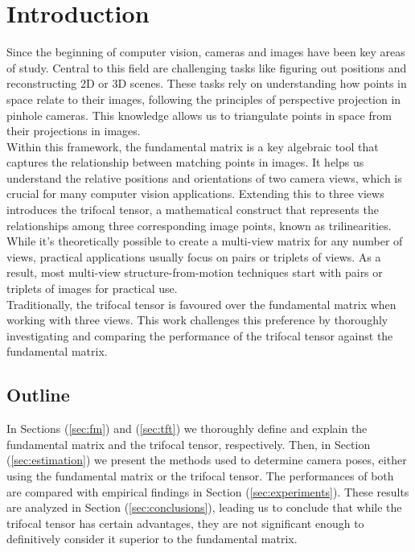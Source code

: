 \section{Introduction}\label{sec:intro}
Since the beginning of computer vision, cameras and images have been key areas of study. Central to this field are challenging tasks like figuring out positions and reconstructing 2D or 3D scenes. These tasks rely on understanding how points in space relate to their images, following the principles of perspective projection in pinhole cameras. This knowledge allows us to triangulate points in space from their projections in images.\\

Within this framework, the fundamental matrix is a key algebraic tool that captures the relationship between matching points in images. It helps us understand the relative positions and orientations of two camera views, which is crucial for many computer vision applications. Extending this to three views introduces the trifocal tensor, a mathematical construct that represents the relationships among three corresponding image points, known as trilinearities. While it's theoretically possible to create a multi-view matrix for any number of views, practical applications usually focus on pairs or triplets of views. As a result, most multi-view structure-from-motion techniques start with pairs or triplets of images for practical use.\\

Traditionally, the trifocal tensor is favoured over the fundamental matrix when working with three views. This work challenges this preference by thoroughly investigating and comparing the performance of the trifocal tensor against the fundamental matrix.\\

\subsection{Outline}

In Sections (\ref{sec:fm}) and (\ref{sec:tft}) we thoroughly define and explain the fundamental matrix and the trifocal tensor, respectively. Then, in Section (\ref{sec:estimation}) we present the methods used to determine camera poses, either using the fundamental matrix or the trifocal tensor. The performances of both are compared with empirical findings in Section (\ref{sec:experiments}). These results are analyzed in Section (\ref{sec:conclusions}), leading us to conclude that while the trifocal tensor has certain advantages, they are not significant enough to definitively consider it superior to the fundamental matrix.

